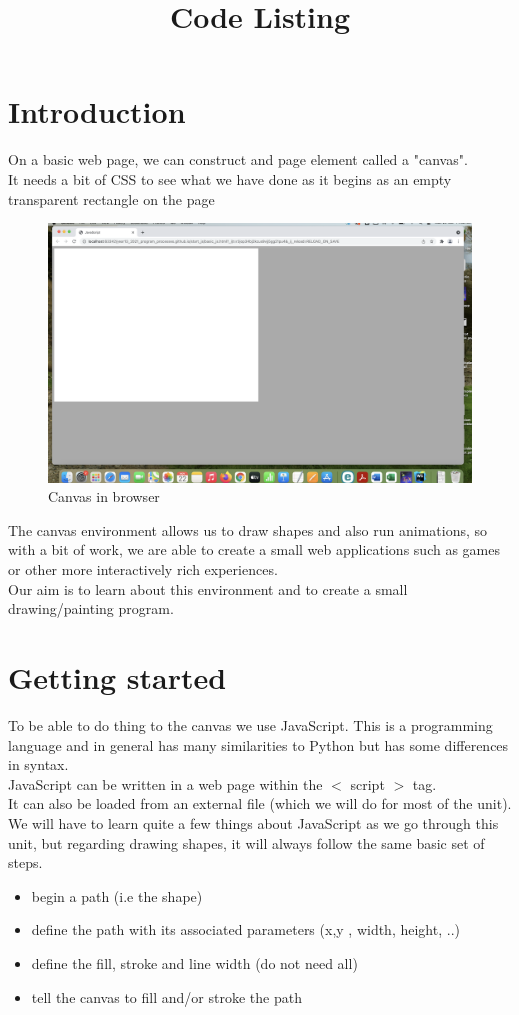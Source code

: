 \documentclass[a4paper,12pt]{article}
\title{Code Listing}
\date{ }
\begin{document}
			\tableofcontents
	\newpage
	\section{Introduction}
	On a basic web page,
	 we can construct and page element called a "canvas". \\
	 It needs a bit of CSS to see what we have done as it begins as an empty transparent rectangle on the page
	
	\begin{figure}[!h]
		\centering
		\includegraphics[width=15cm, angle=0, origin=c]{start_js/canvas_in_window.png}
		\caption{Canvas in browser}
	\end{figure}
	\newpage
	The canvas environment allows us to draw shapes and also run animations, so with a bit of work, we are able to create a small web applications such as games or other more interactively rich  experiences.\\
	Our aim is to learn about this environment and to create a small drawing/painting program.\\
\section{Getting started}
To be able to do thing to the canvas we use JavaScript. This is a programming language and in general has many similarities to Python but has some differences in syntax.\\
JavaScript can be written in a web page within the $<$ script $>$ tag.\\
It can also be loaded from an external file (which we will do for most of the unit).
We will have to learn quite a few things about JavaScript as we go through this unit, but regarding drawing shapes, it will always follow the same basic set of steps.
\begin{itemize}
	\item begin a path (i.e the shape)
	\item define the path with its associated parameters (x,y , width, height, ..)
	\item define the fill, stroke and line width (do not need all)
	\item tell the canvas to fill and/or stroke the path
\end{itemize}

\end{document}
